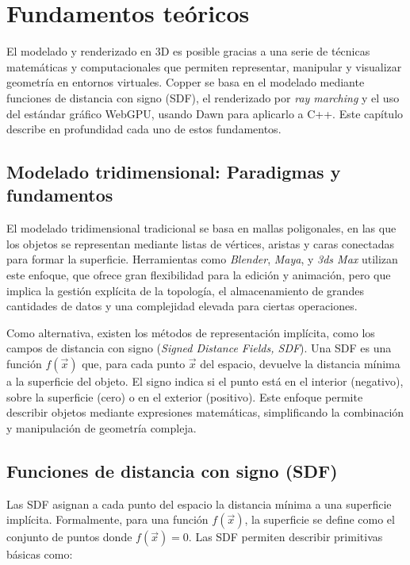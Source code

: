 \chapter{Fundamentos teóricos}

El modelado y renderizado en 3D es posible gracias a una serie de técnicas
matemáticas y computacionales que permiten representar, manipular y visualizar
geometría en entornos virtuales. Copper se basa en el modelado mediante
funciones de distancia con signo (SDF), el renderizado por \textit{ray
    marching} y el uso del estándar gráfico WebGPU, usando Dawn para aplicarlo a
C++. Este capítulo describe en profundidad cada uno de estos fundamentos.

\section{Modelado tridimensional: Paradigmas y fundamentos}

El modelado tridimensional tradicional se basa en mallas poligonales, en las
que los objetos se representan mediante listas de vértices, aristas y caras
conectadas para formar la superficie. Herramientas como \textit{Blender},
\textit{Maya}, y \textit{3ds Max} utilizan este enfoque, que ofrece gran
flexibilidad para la edición y animación, pero que implica la gestión explícita
de la topología, el almacenamiento de grandes cantidades de datos y una
complejidad elevada para ciertas operaciones.

Como alternativa, existen los métodos de representación implícita, como los
campos de distancia con signo (\textit{Signed Distance Fields, SDF}). Una SDF
es una función $f(\vec{x})$ que, para cada punto $\vec{x}$ del espacio,
devuelve la distancia mínima a la superficie del objeto\cite{hart1996}. El
signo indica si el punto está en el interior (negativo), sobre la superficie
(cero) o en el exterior (positivo). Este enfoque permite describir objetos
mediante expresiones matemáticas, simplificando la combinación y manipulación
de geometría compleja.

\section{Funciones de distancia con signo (SDF)}

Las SDF asignan a cada punto del espacio la distancia mínima a una superficie
implícita. Formalmente, para una función $f(\vec{x})$, la superficie se define
como el conjunto de puntos donde $f(\vec{x}) = 0$. Las SDF permiten describir
primitivas básicas como:

